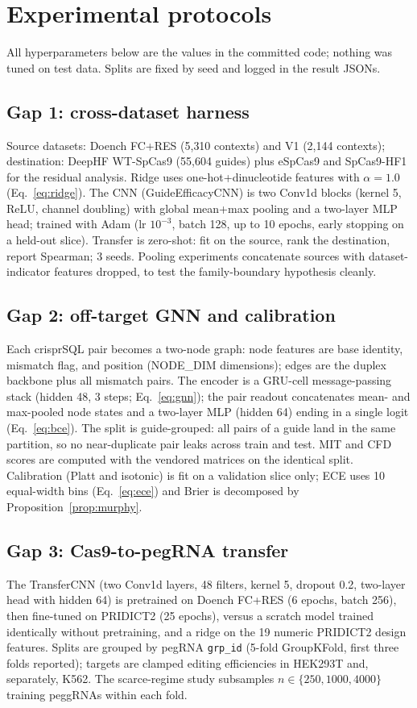 \section{Experimental protocols}
\label{sec:protocols}
All hyperparameters below are the values in the committed code; nothing
was tuned on test data. Splits are fixed by seed and logged in the
result JSONs.

\subsection{Gap 1: cross-dataset harness}
Source datasets: Doench FC+RES (5{,}310 contexts) and V1 (2{,}144
contexts); destination: DeepHF WT-SpCas9 (55{,}604 guides) plus eSpCas9
and SpCas9-HF1 for the residual analysis. Ridge uses
one-hot+dinucleotide features with $\alpha=1.0$
(Eq.~\eqref{eq:ridge}). The CNN (GuideEfficacyCNN) is two Conv1d blocks
(kernel 5, ReLU, channel doubling) with global mean+max pooling and a
two-layer MLP head; trained with Adam (lr $10^{-3}$, batch 128, up to
10 epochs, early stopping on a held-out slice). Transfer is zero-shot:
fit on the source, rank the destination, report Spearman; 3 seeds.
Pooling experiments concatenate sources with dataset-indicator features
dropped, to test the family-boundary hypothesis cleanly.

\subsection{Gap 2: off-target GNN and calibration}
Each crisprSQL pair becomes a two-node graph: node features are base
identity, mismatch flag, and position (NODE\_DIM dimensions); edges are
the duplex backbone plus all mismatch pairs. The encoder is a GRU-cell
message-passing stack (hidden 48, 3 steps; Eq.~\eqref{eq:gnn}); the pair
readout concatenates mean- and max-pooled node states and a two-layer MLP
(hidden 64) ending in a single logit (Eq.~\eqref{eq:bce}). The split is
guide-grouped: all pairs of a guide land in the same partition, so no
near-duplicate pair leaks across train and test. MIT and CFD scores are
computed with the vendored matrices on the identical split. Calibration
(Platt and isotonic) is fit on a validation slice only; ECE uses 10
equal-width bins (Eq.~\eqref{eq:ece}) and Brier is decomposed by
Proposition~\ref{prop:murphy}.

\subsection{Gap 3: Cas9-to-pegRNA transfer}
The TransferCNN (two Conv1d layers, 48 filters, kernel 5, dropout 0.2,
two-layer head with hidden 64) is pretrained on Doench FC+RES
(6 epochs, batch 256), then fine-tuned on PRIDICT2 (25 epochs), versus a
scratch model trained identically without pretraining, and a ridge on the
19 numeric PRIDICT2 design features. Splits are grouped by pegRNA
\texttt{grp\_id} (5-fold GroupKFold, first three folds reported); targets
are clamped editing efficiencies in HEK293T and, separately, K562. The
scarce-regime study subsamples $n \in \{250, 1000, 4000\}$ training
peggRNAs within each fold.

